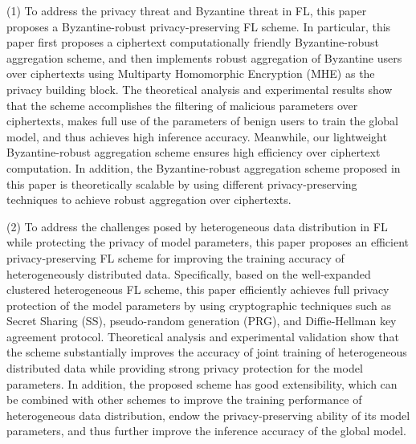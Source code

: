 \begin{eabstract}
(1) To address the privacy threat and Byzantine threat in FL, this paper proposes a Byzantine-robust privacy-preserving FL scheme. In particular, this paper first proposes a ciphertext computationally friendly Byzantine-robust aggregation scheme, and then implements robust aggregation of Byzantine users over ciphertexts using Multiparty Homomorphic Encryption (MHE) as the privacy building block. The theoretical analysis and experimental results show that the scheme accomplishes the filtering of malicious parameters over ciphertexts, makes full use of the parameters of benign users to train the global model, and thus achieves high inference accuracy. Meanwhile, our lightweight Byzantine-robust aggregation scheme ensures high efficiency over ciphertext computation. In addition, the Byzantine-robust aggregation scheme proposed in this paper is theoretically scalable by using different privacy-preserving techniques to achieve robust aggregation over ciphertexts.

(2) To address the challenges posed by heterogeneous data distribution in FL while protecting the privacy of model parameters, this paper proposes an efficient privacy-preserving FL scheme for improving the training accuracy of heterogeneously distributed data. Specifically, based on the well-expanded clustered heterogeneous FL scheme, this paper efficiently achieves full privacy protection of the model parameters by using cryptographic techniques such as Secret Sharing (SS), pseudo-random generation (PRG), and Diffie-Hellman key agreement protocol. Theoretical analysis and experimental validation show that the scheme substantially improves the accuracy of joint training of heterogeneous distributed data while providing strong privacy protection for the model parameters. In addition, the proposed scheme has good extensibility, which can be combined with other schemes to improve the training performance of heterogeneous data distribution, endow the privacy-preserving ability of its model parameters, and thus further improve the inference accuracy of the global model.

\end{eabstract}

